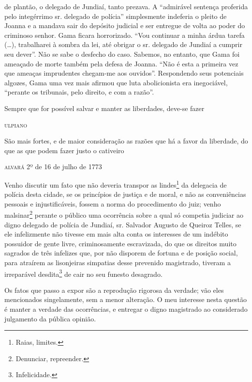 {\begin{didascalia}
{de plantão, o delegado de Jundiaí, tanto prezava. A ``admirável sentença
proferida pelo integérrimo sr. delegado de polícia'' simplesmente
indeferia o pleito de Joanna e a mandava sair do depósito judicial e ser
entregue de volta ao poder do criminoso senhor. Gama ficara horrorizado.
``Vou continuar a minha árdua tarefa (\ldots{}), trabalharei à sombra da lei,
até obrigar o sr. delegado de Jundiaí a cumprir seu dever''. Não se sabe
o desfecho do caso. Sabemos, no entanto, que Gama foi ameaçado de morte
também pela defesa de Joanna. ``Não é esta a primeira vez que ameaças
imprudentes chegam-me aos ouvidos''. Respondendo seus potenciais algozes,
Gama uma vez mais afirmou que luta abolicionista era inegociável,
``perante os tribunais, pelo direito, e com a razão''.}
\end{didascalia}

\epigraph{Sempre que for possível salvar e manter as liberdades, deve-se
fazer}{\textsc{ulpiano}\footnotemark}


\epigraph{São mais fortes, e de maior consideração as razões que há a favor
da liberdade, do que as que podem fazer justo o cativeiro}{\textsc{alvará 2º}
de 16 de julho de 1773}

Venho discutir um fato que não deveria transpor as lindes\footnote{
  Raias, limites.} da delegacia de polícia desta cidade, se os
princípios de justiça e de moral, e não as conveniências pessoais e
injustificáveis, fossem a norma do procedimento do juiz; venho
malsinar\footnote{ Denunciar, repreender.} perante o público uma
ocorrência sobre a qual só competia judiciar ao digno delegado de
polícia de Jundiaí, sr. Salvador Augusto de Queiroz Telles, se ele
infelizmente não tivesse em mais alta conta os interesses de um indébito
possuidor de gente livre, criminosamente escravizada, do que os direitos
muito sagrados de três infelizes que, por não disporem de fortuna e de
posição social, para atraírem as lisonjeiras simpatias desse prevenido
magistrado, tiveram a irreparável desdita\footnote{ Infelicidade.} de
cair no seu funesto desagrado.

Os fatos que passo a expor são a reprodução rigorosa da verdade; vão
eles mencionados singelamente, sem a menor alteração. O meu interesse
nesta questão é manter a verdade das ocorrências, e entregar o digno
magistrado ao considerado julgamento da pública opinião.

}
